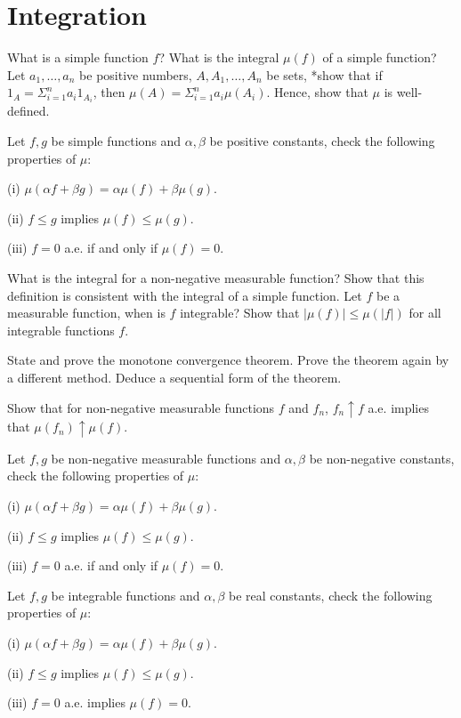\section{Integration}
\begin{question}{12}
    What is a simple function $f$? What is the integral $\mu(f)$ of a simple function? Let $a_1, \dots, a_n$ be positive numbers, $A, A_1, \dots, A_n$ be sets, *show that if $1_A = \Sigma_{i=1}^n a_i 1_{A_i}$, then $\mu(A) = \Sigma_{i=1}
    ^n a_i \mu(A_i)$. Hence, show that $\mu$ is well-defined.
    
    
    Let $f,g$ be simple functions and $\alpha,\beta$ be positive constants, check the following properties of $\mu$:

    (i) $\mu(\alpha f + \beta g) = \alpha \mu(f) + \beta \mu(g)$.

    (ii) $f \leq g$ implies $\mu(f) \leq \mu(g)$.

    (iii) $f = 0$ a.e. if and only if $\mu(f) = 0$.

    \bigskip

    What is the integral for a non-negative measurable function? Show that this definition is consistent with the integral of a simple function. Let $f$ be a measurable function, when is $f$ integrable? Show that $|\mu(f)| \leq \mu(|f|)$ for all integrable functions $f$.
\end{question}

\begin{question}{13}
State and prove the monotone convergence theorem. Prove the theorem again by a different method. Deduce a sequential form of the theorem.

Show that for non-negative measurable functions $f$ and $f_n$, $f_n \uparrow f$ a.e. implies that $\mu(f_n) \uparrow \mu(f)$.

Let $f,g$ be non-negative measurable functions and $\alpha,\beta$ be non-negative constants, check the following properties of $\mu$:

    (i) $\mu(\alpha f + \beta g) = \alpha \mu(f) + \beta \mu(g)$.

    (ii) $f \leq g$ implies $\mu(f) \leq \mu(g)$.

    (iii) $f = 0$ a.e. if and only if $\mu(f) = 0$.

Let $f,g$ be integrable functions and $\alpha,\beta$ be real constants, check the following properties of $\mu$:

    (i) $\mu(\alpha f + \beta g) = \alpha \mu(f) + \beta \mu(g)$.

    (ii) $f \leq g$ implies $\mu(f) \leq \mu(g)$.

    (iii) $f = 0$ a.e. implies $\mu(f) = 0$.
\end{question}

